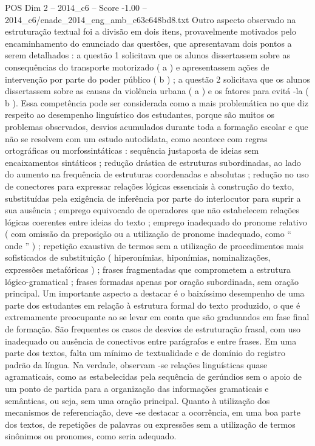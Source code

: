 \begin{textsample}{POS Dim 2 – 2014\_c6 – Score -1.00 – 2014\_c6/enade\_2014\_eng\_amb\_c63c648bd8.txt}
Outro aspecto observado na estruturação textual foi a divisão em dois itens, provavelmente motivados pelo encaminhamento do enunciado das questões, que apresentavam dois pontos a serem detalhados : a questão 1 solicitava que os alunos dissertassem sobre as consequências do transporte motorizado ( a ) e apresentassem ações de intervenção por parte do poder público ( b ) ; a questão 2 solicitava que os alunos dissertassem sobre as causas da violência urbana ( a ) e os fatores para evitá -la ( b ).
Essa competência pode ser considerada como a mais problemática no que diz respeito ao desempenho linguístico dos estudantes, porque são muitos os problemas observados, desvios acumulados durante toda a formação escolar e que não se resolvem com um estudo autodidata, como acontece com regras ortográficas ou morfossintáticas : sequência justaposta de ideias sem encaixamentos sintáticos ; redução drástica de estruturas subordinadas, ao lado do aumento na frequência de estruturas coordenadas e absolutas ; redução no uso de conectores para expressar relações lógicas essenciais à construção do texto, substituídas pela exigência de inferência por parte do interlocutor para suprir a sua ausência ; emprego equivocado de operadores que não estabelecem relações lógicas coerentes entre ideias do texto ; emprego inadequado do pronome relativo ( com omissão da preposição ou a utilização de pronome inadequado, como “ onde ” ) ; repetição exaustiva de termos sem a utilização de procedimentos mais sofisticados de substituição ( hiperonímias, hiponímias, nominalizações, expressões metafóricas ) ; frases fragmentadas que comprometem a estrutura lógico-gramatical ; frases formadas apenas por oração subordinada, sem oração principal.
Um importante aspecto a destacar é o baixíssimo desempenho de uma parte dos estudantes em relação à estrutura formal do texto produzido, o que é extremamente preocupante ao se levar em conta que são graduandos em fase final de formação.
São frequentes os casos de desvios de estruturação frasal, com uso inadequado ou ausência de conectivos entre parágrafos e entre frases.
Em uma parte dos textos, falta um mínimo de textualidade e de domínio do registro padrão da língua.
Na verdade, observam -se relações linguísticas quase agramaticais, como as estabelecidas pela sequência de gerúndios sem o apoio de um ponto de partida para a organização das informações gramaticais e semânticas, ou seja, sem uma oração principal.
Quanto à utilização dos mecanismos de referenciação, deve -se destacar a ocorrência, em uma boa parte dos textos, de repetições de palavras ou expressões sem a utilização de termos sinônimos ou pronomes, como seria adequado.

\end{textsample}
